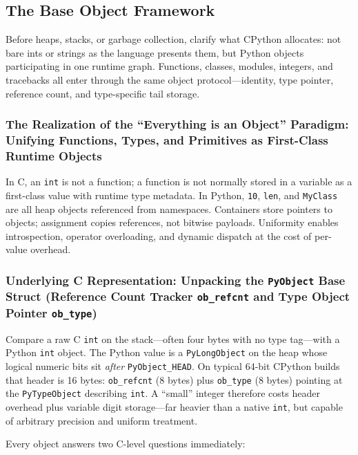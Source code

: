 \subsection{The Base Object Framework}

Before heaps, stacks, or garbage collection, clarify what CPython allocates: not bare ints or strings as the language presents them, but Python objects participating in one runtime graph. Functions, classes, modules, integers, and tracebacks all enter through the same object protocol---identity, type pointer, reference count, and type-specific tail storage.

\subsubsection{The Realization of the ``Everything is an Object'' Paradigm: Unifying Functions, Types, and Primitives as First-Class Runtime Objects}

In C, an \texttt{int} is not a function; a function is not normally stored in a variable as a first-class value with runtime type metadata. In Python, \texttt{10}, \texttt{len}, and \texttt{MyClass} are all heap objects referenced from namespaces. Containers store pointers to objects; assignment copies references, not bitwise payloads. Uniformity enables introspection, operator overloading, and dynamic dispatch at the cost of per-value overhead.

\subsubsection{Underlying C Representation: Unpacking the \texttt{PyObject} Base Struct (Reference Count Tracker \texttt{ob\_refcnt} and Type Object Pointer \texttt{ob\_type})}

Compare a raw C \texttt{int} on the stack---often four bytes with no type tag---with a Python \texttt{int} object. The Python value is a \texttt{PyLongObject} on the heap whose logical numeric bits sit \emph{after} \texttt{PyObject\_HEAD}. On typical 64-bit CPython builds that header is 16 bytes: \texttt{ob\_refcnt} (8 bytes) plus \texttt{ob\_type} (8 bytes) pointing at the \texttt{PyTypeObject} describing \texttt{int}. A ``small'' integer therefore costs header overhead plus variable digit storage---far heavier than a native \texttt{int}, but capable of arbitrary precision and uniform treatment.

Every object answers two C-level questions immediately:

